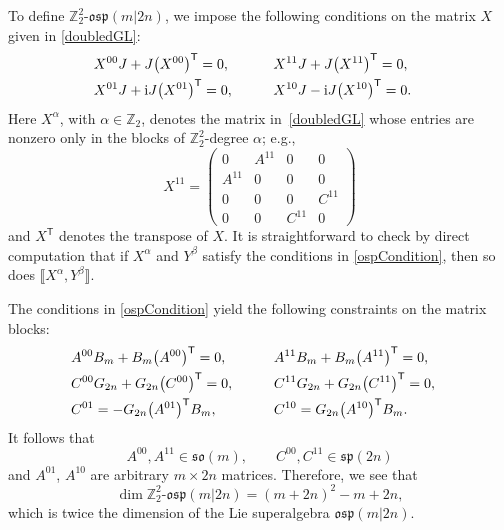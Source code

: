 \documentclass[10pt,a4paper]{amsart}
\numberwithin{equation}{section}
\theoremstyle{definition}
\def\Z2{\mathbb{Z}_2^2}
\def\osp{\mathfrak{osp}}
\def\so{\mathfrak{so}}
\def\sp{\mathfrak{sp}}
\def\Zosp{$\Z2$-$\osp(m|2n)$}
\begin{document}
To define \Zosp, we impose the following conditions on the matrix $X$ given in \eqref{doubledGL}:
\begin{alignat}{3}
&	X^{00}J + J \bigl(X^{00}\bigr)^{\mathsf{T}}= 0,\qquad &&
	X^{11}J + J \bigl(X^{11}\bigr)^{\mathsf{T}}= 0,&
	\notag\\
&	X^{01}J + {\rm i}J \bigl(X^{01}\bigr)^{\mathsf{T}}= 0,
	\qquad &&
	X^{10}J -{\rm i} J \bigl(X^{10}\bigr)^{\mathsf{T}}= 0.& \label{ospCondition}
\end{alignat}
Here $X^{\alpha}$, with $\alpha \in \mathbb{Z}_2$, denotes the matrix in~\eqref{doubledGL} whose entries are nonzero only in the blocks of $\mathbb{Z}_2^2$-degree $\alpha$; e.g.,
\begin{equation*}
	X^{11} =
	\begin{pmatrix}
		0 & A^{11} & 0 & 0
		\\
		A^{11} & 0 & 0 & 0
		\\
		0 & 0 & 0 & C^{11}
		\\
		0 & 0 & C^{11} & 0
	\end{pmatrix}
\end{equation*}
and $ X^{\mathsf{T}} $ denotes the transpose of $X.$
It is straightforward to check by direct computation that if $X^{\alpha}$ and $Y^{\beta}$ satisfy the conditions in \eqref{ospCondition}, then so does $\llbracket X^{\alpha}, Y^{\beta} \rrbracket$.

The conditions in \eqref{ospCondition} yield the following constraints on the matrix blocks:
\begin{alignat}{3}
	&A^{00} B_m+ B_m \bigl(A^{00}\bigr)^{\mathsf{T}} = 0, \qquad && A^{11} B_m+ B_m \bigl(A^{11}\bigr)^{\mathsf{T}} = 0,&
	\notag\\
&	C^{00}G_{2n}+ G_{2n}\bigl(C^{00}\bigr)^{\mathsf{T}} = 0,\qquad&& C^{11} G_{2n}+ G_{2n}\bigl(C^{11}\bigr)^{\mathsf{T}} = 0,&
	\notag \\
&	C^{01}= -G_{2n}\bigl(A^{01}\bigr)^{\mathsf{T}} B_m, \qquad && C^{10}= G_{2n}\bigl(A^{10}\bigr)^{\mathsf{T}} B_m.&
	\label{StrOfX}
\end{alignat}
It follows that
\begin{equation*}
	A^{00}, A^{11} \in \so(m), \qquad C^{00}, C^{11} \in \sp(2n)
\end{equation*}
and $ A^{01}$, $A^{10}$ are arbitrary $ m \times 2n$ matrices.
Therefore, we see that
\[
\dim \Z2\text{-}\osp(m|2n) = (m+2n)^2-m+2n,
\]
which is twice the dimension of the Lie superalgebra $\osp(m|2n)$.
\end{document}
